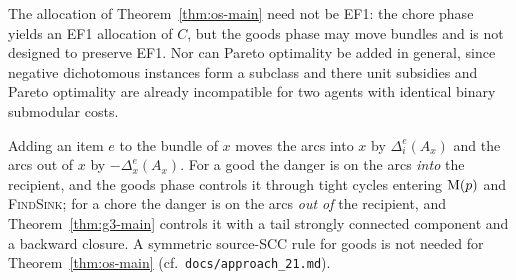 \begin{remark}
\label{rem:os-scope}
The allocation of Theorem~\ref{thm:os-main} need not be EF1: the chore phase
yields an EF1 allocation of $C$, but the goods phase may move bundles and is
not designed to preserve EF1. Nor can Pareto optimality be added in general,
since negative dichotomous instances form a subclass and there unit subsidies
and Pareto optimality are already incompatible for two agents with identical
binary submodular costs.
\end{remark}

\begin{remark}
\label{rem:os-directions}
Adding an item $e$ to the bundle of $x$ moves the arcs into $x$ by
$\Delta_i^e(A_x)$ and the arcs out of $x$ by $-\Delta_x^e(A_x)$. For a good the
danger is on the arcs \emph{into} the recipient, and the goods phase controls
it through tight cycles entering $\mathrm{M}(p)$ and \textsc{FindSink}; for
a chore the danger is on the arcs \emph{out of} the recipient, and
Theorem~\ref{thm:g3-main} controls it with a tail strongly connected component
and a backward closure. A symmetric source-SCC rule for goods is not needed
for Theorem~\ref{thm:os-main} (cf.\ \texttt{docs/approach\_21.md}).
\end{remark}
